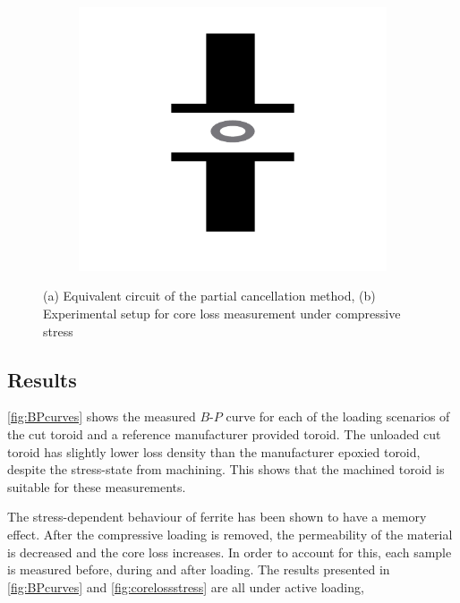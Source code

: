 \documentclass[conference]{IEEEtran}
\begin{document}
\begin{figure}[t]
  \begin{subfigure}{\columnwidth}
    \centering
    
    \caption{}
    \label{fig:partialcancellationcircuit}
  \end{subfigure}
  \begin{subfigure}{\columnwidth}
    \centering
    \includegraphics{figures/experimentalsetup.pdf}
    \caption{}
    \label{fig:experimentalsetup}
  \end{subfigure}
  \caption{(a) Equivalent circuit of the partial cancellation method, (b) Experimental setup for core loss measurement under compressive stress}
\end{figure}

\subsection{Results}

\cref{fig:BPcurves} shows the measured $B$-$P$ curve for each of the loading scenarios of the cut toroid and a reference manufacturer provided toroid. 
The unloaded cut toroid has slightly lower loss density than the manufacturer epoxied toroid, despite the stress-state from machining. 
This shows that the machined toroid is suitable for these measurements. 

The stress-dependent behaviour of ferrite has been shown to have a memory effect. 
After the compressive loading is removed, the permeability of the material is decreased and the core loss increases. 
In order to account for this, each sample is measured before, during and after loading. 
The results presented in \cref{fig:BPcurves} and \cref{fig:corelossstress} are all under active loading, 
\end{document}
